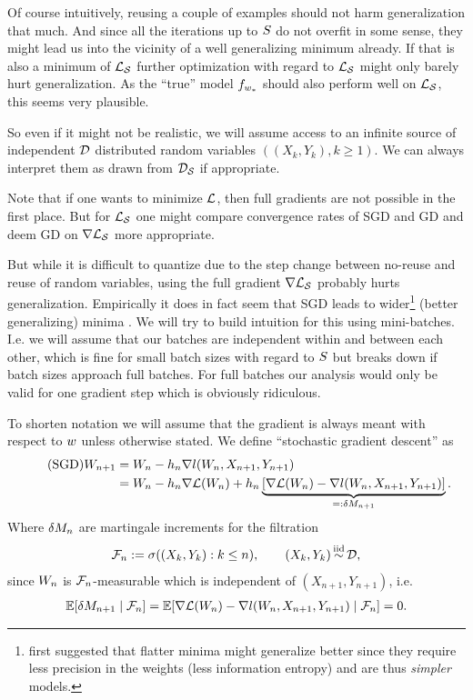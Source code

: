 Of course intuitively, reusing a couple of examples should not harm
generalization that much. And since all the iterations up to \(\sampleSize\)
do not overfit in some sense, they might lead us into the vicinity of a well
generalizing minimum already. If that is also a minimum of \(\Loss_\sample\)
further optimization with regard to \(\Loss_\sample\) might only barely hurt
generalization. As the ``true'' model \(\model[\minimum]\) should also perform
well on \(\Loss_\sample\), this seems very plausible.

So even if it might not be realistic, we will assume access to an infinite
source of independent \(\dist\) distributed random variables \(((X_k,Y_k), k\ge 1)\).
We can always interpret them as drawn from \(\dist_\sample\) if appropriate.

Note that if one wants to minimize \(\Loss\), then full gradients are not
possible in the first place. But for \(\Loss_\sample\) one might compare
convergence rates of SGD and GD and deem GD on \(\nabla\Loss_\sample\) more
appropriate.

But while it is difficult to quantize due to the step change between no-reuse
and reuse of random variables, using the full gradient \(\nabla\Loss_\sample\)
probably hurts generalization. Empirically it does in fact
seem that SGD leads to wider\footnote{
\textcite{hochreiterFlatMinima1997} first suggested that flatter minima might
	generalize better since they require less precision in the weights (less
	information entropy) and are thus \emph{simpler} models.
}
(better generalizing) minima \parencite{liVisualizingLossLandscape2018}.
We will try to build intuition for this using mini-batches. I.e. we
will assume that our batches are independent within and between each other,
which is fine for small batch sizes with regard to \(\sampleSize\) but breaks
down if batch sizes approach full batches. For full batches our analysis would
only be valid for one gradient step which is obviously ridiculous.

To shorten notation we will assume that the gradient is always meant
with respect to \(\weights\) unless otherwise stated.
We define ``stochastic gradient descent'' as
%
\begin{align}
	\tag{SGD}
	\Weights_{n+1}
	&= \Weights_n - \lr_n\nabla\loss(\Weights_n, X_{n+1},Y_{n+1})\\
	\nonumber
	&= \Weights_n - \lr_n\nabla\Loss(\Weights_n)
	+ \lr_n\underbrace{
		[\nabla\Loss(\Weights_n) - \nabla\loss(\Weights_n, X_{n+1}, Y_{n+1})]
	}_{=:\martIncr_{n+1}}.
\end{align}
Where \(\martIncr_n\) are martingale increments for the filtration
\begin{align*}
	\filtration_n :=\sigma((X_k, Y_k): k\le n ),
	\qquad (X_k,Y_k)\stackrel{\text{iid}}{\sim}\dist,
\end{align*}
since \(\Weights_n\) is \(\filtration_n\)-measurable which is independent of
\((X_{n+1},Y_{n+1})\), i.e.\ 
\begin{align}\label{eq: conditional independence of martingale increments}
	\E[\martIncr_{n+1}\mid \filtration_n]
	= \E[\nabla\Loss(\Weights_n) - \nabla\loss(\Weights_n, X_{n+1}, Y_{n+1})\mid \filtration_n]
	= 0.
\end{align}
%
